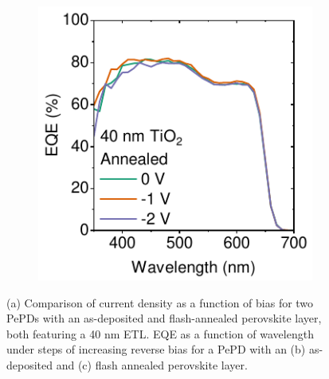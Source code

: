 \begin{figure}[htbp]
\begin{subfigure}[t]{0.32\textwidth}
        \caption{}
        \label{fig:ch2:as_dep_eqe}
    \end{subfigure}
    \hfill
    \begin{subfigure}[t]{0.32\textwidth}
        \centering
        \includegraphics[width=\textwidth]{chapters/material_properties/images/Annealed_EQE.pdf} %
        \caption{}
        \label{fig:ch2:annealed_eqe}
    \end{subfigure}
    \caption[Impact of thermal annealing on JVs and EQE of PePDs with 40 nm of  as the ETL.]{(a) Comparison of current density as a function of bias for two PePDs with an as-deposited and flash-annealed perovskite layer, both featuring a 40 nm  ETL. EQE as a function of wavelength under steps of increasing reverse bias for a PePD with an (b) as-deposited and (c) flash annealed perovskite layer.}
    \label{fig:ETL_opt:annealing_impact}
\end{figure}

